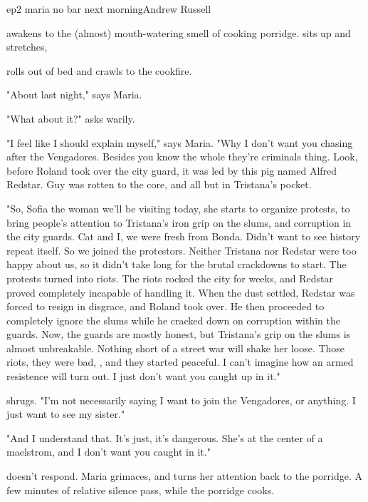 \documentclass{book}
\begin{document}
\begin{childnode}{ep2 maria no bar next morning}{Andrew Russell}

    \name{} awakens to the (almost) mouth-watering smell of cooking porridge. \HeShe{} sits up and stretches, 

    \HeShe{} rolls out of bed and crawls to the cookfire. 

    "About last night," says Maria.

    "What about it?" asks \name{} warily.

    "I feel like I should explain myself," says Maria. "Why I don't want you chasing after the Vengadores. Besides you know the whole they're criminals thing. Look, before Roland took over the city 
    guard, it was led by this pig named
    Alfred Redstar. Guy was rotten to the core, and all but in Tristana's pocket.
    
    "So, Sofia the woman we'll be visiting today, she starts to organize protests, to bring people's attention to Tristana's iron grip on the slums, and 
    corruption in the city guards. Cat and I, we were fresh from
    Bonda. Didn't want to see history repeat itself. So we joined the protestors. Neither Tristana nor Redstar were too happy about us, so it didn't take long for the brutal crackdowns to start. The protests turned into riots. The riots rocked the city for
    weeks, and Redstar proved completely incapable of handling it. When the dust settled, Redstar was forced to resign in disgrace, and Roland took over. He then proceeded to completely ignore the slums while he cracked down on corruption within the guards. Now,
    the guards are mostly honest, but Tristana's grip on the slums is almost unbreakable. Nothing short of a street war will shake her loose. Those riots, they were bad, \nickname{}, and they started peaceful. I can't imagine how an armed resistence will turn 
    out. I just don't want you caught up in it."

    \name{} shrugs. "I'm not necessarily saying I want to join the Vengadores, or anything. I just want to see my sister." 

    "And I understand that. It's just, it's dangerous. She's at the center of a maelstrom, and I don't want you caught in it."

    \name{} doesn't respond. Maria grimaces, and turns her attention back to the porridge. A few minutes of relative silence pass, while the porridge cooks.


\end{childnode}
\end{document}

